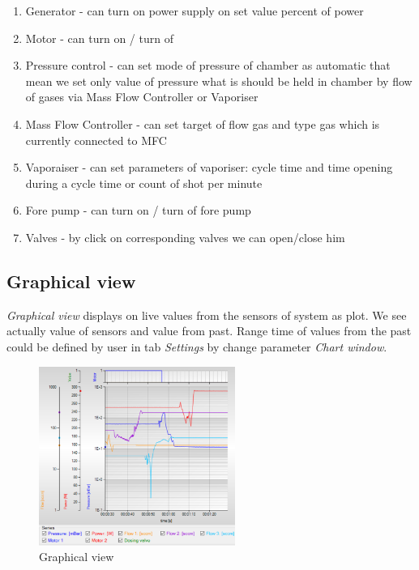 	\begin{enumerate}
		\item  Generator - can turn on power supply on set value percent of power
		\item  Motor - can turn on / turn of 
		\item  Pressure control - can set mode of pressure of chamber as automatic that mean we set only value
			of pressure what is should be held in chamber by flow of gases via Mass Flow Controller or Vaporiser
		\item Mass Flow Controller - can set target of flow gas and type gas which is currently connected to MFC
		\item Vaporaiser - can set parameters of vaporiser: cycle time and time opening during a cycle time or count of shot per minute
	   \item Fore pump - can turn on / turn of fore pump
	  \item Valves - by click on corresponding  valves we can open/close him

	\end{enumerate}

\subsection{Graphical view}

\textit{Graphical view} displays on live values from the sensors of system as plot. We see actually value of sensors and value from past. Range time of  values from the past could be defined by user in tab \textit{Settings} by change parameter \textit{Chart window}. 

	\begin{figure}[!h] 
	\centering \includegraphics[width=0.57\textwidth]{Graphic/MainScreen/Chart.png}	
	\caption{Graphical view}
	\label{graphical_view}
	\end{figure}
	\FloatBarrier


